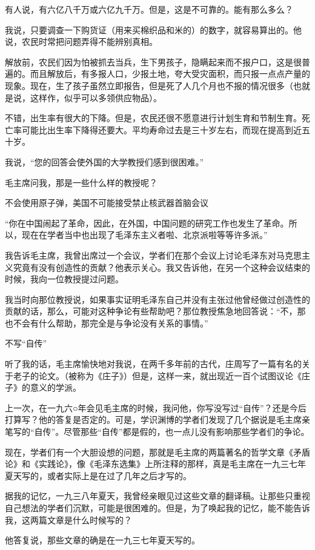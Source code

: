 有人说，有六亿八千万或六亿九千万。但是，这是不可靠的。能有那么多么？

我说，只要调查一下购货证（用来买棉织品和米的）的数字，就容易算出的。他说，农民时常把问题弄得不能辨别真相。

解放前，农民们因为怕被抓去当兵，生下男孩子，隐瞒起来而不报户口，这是很普遍的。而且解放后，有多报人口，少报土地，夸大受灾面积，而只报一点点产量的现象。现在，生了孩子虽然立即报告，但是死了人几个月也不报的情况很多（也就是说，这样作，似乎可以多领供应物品）。

不错，出生率有很大的下降。但是，农民还很不愿意进行计划生育和节制生育。死亡率可能比出生率下降得还要大。平均寿命过去是三十岁左右，而现在提高到近五十岁。

我说，“您的回答会使外国的大学教授们感到很困难。”

毛主席问我，那是一些什么样的教授呢？

不会使用原子弹，美国不可能接受禁止核武器首脑会议

“你在中国闹起了革命，因此，在外国，中国问题的研究工作也发生了革命。所以，现在在学者当中也出现了毛泽东主义者啦、北京派啦等等许多派。”

我告诉毛主席，我曾出席过一个会议，学者们在那个会议上讨论毛泽东对马克思主义究竟有没有创造性的贡献？他表示关心。我又告诉他，在另一个这种会议结束的时候，我向一位教授提过问题。

我当时向那位教授说，如果事实证明毛泽东自己并没有主张过他曾经做过创造性的贡献的话，那么，可能对这种争论有些帮助吧？那位教授焦急地回答说：“不，那也不会有什么帮助，那完全是与争论没有关系的事情。”

不写“自传”

听了我的话，毛主席愉快地对我说，在两千多年前的古代，庄周写了一篇有名的关于老子的论文。（被称为《庄子》）但是，这样一来，就出现近一百个试图议论《庄子》的意义的学派。

上一次，在一九六○年会见毛主席的时候，我问他，你写没写过“自传”？还是今后打算写？他的答复是否定的。可是，学识渊博的学者们发现了几个据说是毛主席亲笔写的“自传”。尽管那些“自传”都是假的，也一点儿没有影响那些学者们的争论。

现在，学者们有一个大胆设想的问题，那就是毛主席的两篇著名的哲学文章《矛盾论》和《实践论》，像《毛泽东选集》上所注释的那样，真是毛主席在一九三七年夏天写的，或者实际上是在过了几年之后才写的。

据我的记忆，一九三八年夏天，我曾经亲眼见过这些文章的翻译稿。让那些只重视自己想法的学者们沉默，可能是很困难的。但是，为了唤起我的记忆，能不能告诉我，这两篇文章是什么时候写的？

他答复说，那些文章的确是在一九三七年夏天写的。

